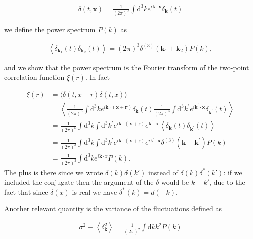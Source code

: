 \begin{align}
    \delta(t, \mathbf{x})=\frac{1}{(2 \pi)^{3}} \int \mathrm{d}^{3} k e^{i \mathbf{k} \cdot \mathbf{x}} \delta_{\mathbf{k}}(t) \label{1.2.112}
\end{align}



we define the power spectrum $P(k)$ as

\begin{align}
    \left\langle\delta_{\mathbf{k}_{1}}(t) \delta_{\mathbf{k}_{2}}(t)\right\rangle=(2 \pi)^{3} \delta^{(3)}\left(\mathbf{k}_{1}+\mathbf{k}_{2}\right) P(k), \label{1.2.113}
\end{align}



and we show that the power spectrum is the Fourier transform of the two-point correlation function $\xi(r)$. In fact


\begin{align}
    \xi(r) & =\langle\delta(t, x+r) \delta(t, x)\rangle \\
    & =\left\langle\frac{1}{(2 \pi)^{3}} \int \mathrm{d}^{3} k e^{i \mathbf{k} \cdot(\mathbf{x}+\mathbf{r})} \delta_{\mathbf{k}}(t) \frac{1}{(2 \pi)^{3}} \int \mathrm{d}^{3} k^{\prime} e^{i \mathbf{k}^{\prime} \cdot \mathbf{x}} \delta_{\mathbf{k}^{\prime}}(t)\right\rangle \\
    & =\frac{1}{(2 \pi)^{6}} \int \mathrm{d}^{3} k \int \mathrm{d}^{3} k^{\prime} e^{i \mathbf{k} \cdot(\mathbf{x}+\mathbf{r})} e^{\mathbf{k}^{\prime} \cdot \mathbf{x}}\left\langle\delta_{\mathbf{k}}(t) \delta_{\mathbf{k}^{\prime}}(t)\right\rangle \\
    & =\frac{1}{(2 \pi)^{3}} \int \mathrm{d}^{3} k \int \mathrm{d}^{3} k^{\prime} e^{i \mathbf{k} \cdot(\mathbf{x}+\mathbf{r})} e^{i \mathbf{k}^{\prime} \cdot \mathbf{x}} \delta^{(3)}\left(\mathbf{k}+\mathbf{k}^{\prime}\right) P(k) \\
    & =\frac{1}{(2 \pi)^{3}} \int \mathrm{d}^{3} k e^{i \mathbf{k} \cdot \mathbf{r}} P(k) . \label{1.2.118}
\end{align}
The plus is there since we wrote $\delta(k)\delta(k')$ instead of $\delta(k)\delta^*(k')$: if we included the conjugate then the argument of the $\delta$ would be $k-k'$, due to the fact that since $\delta(x)$ is real we have $\delta^*(k) = d(-k)$.

Another relevant quantity is the variance of the fluctuations defined as

\begin{align}
    \sigma^{2} \equiv\left\langle\delta_{\mathrm{k}}^{2}\right\rangle=\frac{1}{(2 \pi)^{2}} \int \mathrm{d}k k^2 P(k)  \label{1.2.119}
\end{align}



